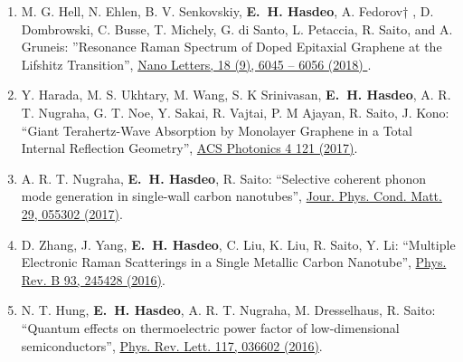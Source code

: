 \documentclass[a4paper,11pt]{article}
\def\hes{{\bf E.~H. Hasdeo}}
\begin{document}
\begin{enumerate}
  \item M. G. Hell, N. Ehlen, B. V. Senkovskiy, \hes, A. Fedorov† , D. Dombrowski, C. Busse, T. Michely, G. di Santo, L. Petaccia, R. Saito, and A. Gruneis: ''Resonance Raman Spectrum of Doped Epitaxial Graphene at the Lifshitz Transition'', \href{http://dx.doi.org/10.1021/acs.nanolett.8b02979}{Nano Letters, 18 (9), 6045 -- 6056 (2018) }.
\item Y. Harada, M. S. Ukhtary, M. Wang, S. K Srinivasan, \hes, A. R. T. Nugraha, G. T. Noe, Y. Sakai, R. Vajtai, P. M Ajayan, R. Saito, J. Kono: ``Giant Terahertz-Wave Absorption by Monolayer Graphene in a Total Internal Reflection Geometry'', \href{http://dx.doi.org/10.1021/acsphotonics.6b00663} {ACS Photonics  4 121 (2017)}.
\item A. R. T. Nugraha, \hes, R. Saito: ``Selective coherent phonon mode generation in single-wall carbon nanotubes'', \href{
https://dx.doi.org/10.1088/1361-648X/29/5/055302}{Jour. Phys. Cond. Matt. 29, 055302 (2017)}.
\item D. Zhang, J. Yang, \hes, C. Liu, K. Liu, R. Saito, Y. Li:
  ``Multiple Electronic Raman Scatterings in a Single Metallic Carbon
  Nanotube'',
  \href{http://dx.doi.org/10.1103/PhysRevB.93.245428}{Phys. Rev. B 93,
    245428 (2016)}.
\item N. T. Hung, \hes, A. R. T. Nugraha, M.  Dresselhaus, R. Saito:
  ``Quantum effects on thermoelectric power factor of low-dimensional
  semiconductors'', \href{http://dx.doi.org/10.1103/PhysRevLett.117.036602}{Phys. Rev. Lett. 117, 036602 (2016)}.


\end{enumerate}
\end{document}
